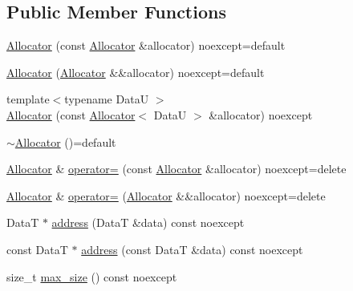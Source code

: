 \subsection*{Public Member Functions}
\begin{DoxyCompactItemize}
\item 
\hyperlink{structmage_1_1_single_ended_memory_stack_1_1_allocator_acc7f17e870881240ee354efe69f9ba34}{Allocator} (const \hyperlink{structmage_1_1_single_ended_memory_stack_1_1_allocator}{Allocator} \&allocator) noexcept=default
\item 
\hyperlink{structmage_1_1_single_ended_memory_stack_1_1_allocator_a445eaee8e10d872886de2f4194ecca72}{Allocator} (\hyperlink{structmage_1_1_single_ended_memory_stack_1_1_allocator}{Allocator} \&\&allocator) noexcept=default
\item 
{\footnotesize template$<$typename DataU $>$ }\\\hyperlink{structmage_1_1_single_ended_memory_stack_1_1_allocator_ac0dc5bf3c1c3293cf081e45ed28101dc}{Allocator} (const \hyperlink{structmage_1_1_single_ended_memory_stack_1_1_allocator}{Allocator}$<$ DataU $>$ \&allocator) noexcept
\item 
\hyperlink{structmage_1_1_single_ended_memory_stack_1_1_allocator_a5b9721b0fb81964988f9f121d6372970}{$\sim$\+Allocator} ()=default
\item 
\hyperlink{structmage_1_1_single_ended_memory_stack_1_1_allocator}{Allocator} \& \hyperlink{structmage_1_1_single_ended_memory_stack_1_1_allocator_a926d9a1415758f188e23ed633ef08ae0}{operator=} (const \hyperlink{structmage_1_1_single_ended_memory_stack_1_1_allocator}{Allocator} \&allocator) noexcept=delete
\item 
\hyperlink{structmage_1_1_single_ended_memory_stack_1_1_allocator}{Allocator} \& \hyperlink{structmage_1_1_single_ended_memory_stack_1_1_allocator_abdf76d57fb2996142cea23883433a097}{operator=} (\hyperlink{structmage_1_1_single_ended_memory_stack_1_1_allocator}{Allocator} \&\&allocator) noexcept=delete
\item 
DataT $\ast$ \hyperlink{structmage_1_1_single_ended_memory_stack_1_1_allocator_a5bb7b9d5ba3907afb70306f7606ab6cd}{address} (DataT \&data) const noexcept
\item 
const DataT $\ast$ \hyperlink{structmage_1_1_single_ended_memory_stack_1_1_allocator_abe5c2b2a569ff0c61f7c4c7ee4625b05}{address} (const DataT \&data) const noexcept
\item 
size\+\_\+t \hyperlink{structmage_1_1_single_ended_memory_stack_1_1_allocator_a9b000beaef4ac49b2019e6aac93d91f0}{max\+\_\+size} () const noexcept

\end{DoxyCompactItemize}
